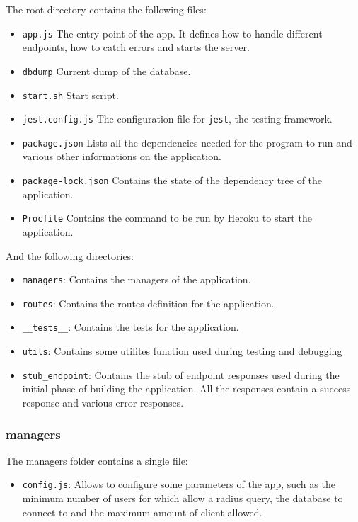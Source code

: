 The root directory contains the following files: 
\begin{itemize}
    \item \texttt{app.js} The entry point of the app. It defines how to handle different endpoints, how to catch errors and starts the server.
    \item \texttt{dbdump} Current dump of the database.
    \item \texttt{start.sh} Start script.
    \item \texttt{jest.config.js} The configuration file for \texttt{jest}, the testing framework.
    \item \texttt{package.json} Lists all the dependencies needed for the program to run and various other informations on the application.
    \item \texttt{package-lock.json} Contains the state of the dependency tree of the application.
    \item  \texttt{Procfile} Contains the command to be run by Heroku to start the application.
\end{itemize}
And the following directories: 
\begin{itemize}
    \item \texttt{managers}: Contains the managers of the application.
    \item \texttt{routes}: Contains the routes definition for the application.
    \item \texttt{\_\_tests\_\_}: Contains the tests for the application. 
    \item \texttt{utils}: Contains some utilites function used during testing and debugging
    \item \texttt{stub\_endpoint}: Contains the stub of endpoint responses used during the initial phase of building the application.
    All the responses contain a success response and various error responses.
\end{itemize}

\subsubsection{managers}
The managers folder contains a single file: 
\begin{itemize}
    \item \texttt{config.js}: Allows to configure some parameters of the app, such as the minimum number of users for which allow a radius query, the database to connect to and the maximum amount of client allowed.
\end{itemize}

